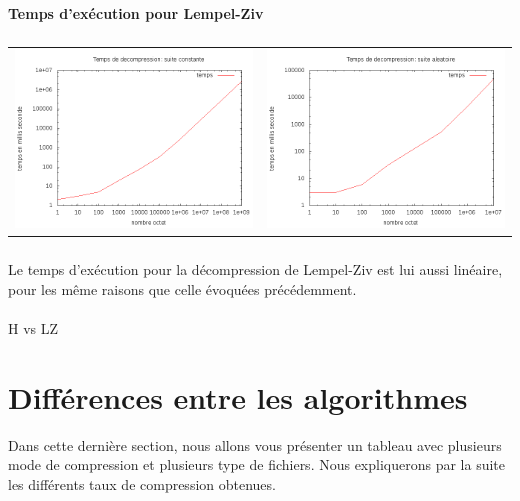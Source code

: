 \documentclass{report}
\begin{document}
\paragraph*{}
\textbf{Temps d’exécution pour Lempel-Ziv}
\subparagraph*{}
\hspace{-2cm}\begin{tabular}{l | l}
\includegraphics[width=7cm]{tempsDlzC.png} & 
\includegraphics[width=7cm]{tempsDlzA.png}
\end{tabular}
\subparagraph*{}

Le temps d'exécution pour la décompression de Lempel-Ziv est lui aussi linéaire, pour les même raisons que celle évoquées précédemment.




\paragraph*{}
H vs LZ

\section*{Différences entre les algorithmes}
Dans cette dernière section, nous allons vous présenter un tableau avec plusieurs mode de compression et plusieurs type de fichiers. 
Nous expliquerons par la suite les différents taux de compression obtenues. 
\end{document}
